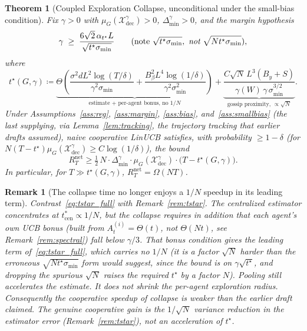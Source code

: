 \documentclass[11pt]{article}
\newtheorem{theorem}{Theorem}[section]
\newtheorem*{remark}{Remark}
\begin{document}
\begin{theorem}[Coupled Exploration Collapse, unconditional under the
small-bias condition]\label{thm:cec}
Fix $\gamma>0$ with $\mu_G(\mathcal{X}_{\mathrm{dec}}^\gamma)>0$,
$\Delta_{\min}^\gamma>0$, and the \emph{margin hypothesis}
\begin{equation}
\gamma\;\geq\;\frac{6\sqrt{2}\,\alpha_{t^\star}L}{\sqrt{t^\star\sigma_{\min}}}
\qquad(\text{note }\sqrt{t^\star\sigma_{\min}},\ \emph{not}\ \sqrt{Nt^\star\sigma_{\min}}),
\label{eq:margin_hyp}
\end{equation}
where
\begin{equation}
t^\star(G,\gamma)\coloneqq
\underbrace{\Theta\!\left(
\frac{\sigma^2 dL^2\log(T/\delta)}{\gamma^2\sigma_{\min}}
+\frac{B_\beta^2 L^4\log(1/\delta)}{\gamma^2\sigma_{\min}^2}\right)}_{\text{estimate + per-agent bonus, no }1/N}
+\underbrace{\frac{C\sqrt{N}\,L^3(B_y+S)}{\gamma(W)\,\gamma\,\sigma_{\min}^{3/2}}}_{\text{gossip proximity, }\propto\sqrt N}.
\label{eq:tstar_full}
\end{equation}
Under Assumptions~\ref{ass:reg}, \ref{ass:margin}, \ref{ass:bias},
and~\ref{ass:smallbias} (the last supplying, via
Lemma~\ref{lem:tracking}, the trajectory tracking that earlier drafts
assumed), naive cooperative LinUCB
satisfies, with probability $\geq 1-\delta$ (for
$N(T-t^\star)\mu_G(\mathcal{X}_{\mathrm{dec}}^\gamma)\geq C\log(1/\delta)$), the bound
\begin{equation}
R_T^{\mathrm{net}}\geq
\tfrac12\,N\cdot\Delta_{\min}^\gamma\cdot\mu_G(\mathcal{X}_{\mathrm{dec}}^\gamma)
\cdot\bigl(T-t^\star(G,\gamma)\bigr).
\label{eq:cec_bound}
\end{equation}
In particular, for $T\gg t^\star(G,\gamma)$,
$R_T^{\mathrm{net}}=\Omega(NT)$.
\end{theorem}

\begin{remark}[The collapse time no longer enjoys a $1/N$ speedup in
its leading term]\label{rem:noN}
Contrast~\eqref{eq:tstar_full} with Remark~\ref{rem:tstar}. The
\emph{centralized estimator} concentrates at $t_{\mathrm{cen}}^*\propto
1/N$, but the \emph{collapse} requires in addition that each agent's
own UCB bonus (built from $A_t^{(i)}=\Theta(t)$, \emph{not}
$\Theta(Nt)$, see Remark~\ref{rem:spectral}) fall below $\gamma/3$.
That bonus condition gives the leading term of~\eqref{eq:tstar_full},
which carries \emph{no} $1/N$ (it is a factor $\sqrt N$ harder than the
erroneous $\sqrt{Nt^\star\sigma_{\min}}$ form would suggest, since the bound is
on $\gamma\sqrt{t^\star}$, and dropping the spurious $\sqrt N$ raises the
required $t^\star$ by a factor $N$).  Pooling still accelerates the
\emph{estimate}. It does not shrink the per-agent exploration radius.
Consequently the cooperative speedup of collapse is weaker than the
earlier draft claimed.
The genuine cooperative gain is the $1/\sqrt N$ variance reduction in the
estimator error (Remark~\ref{rem:tstar}), not an acceleration of
$t^\star$.
\end{remark}
\end{document}

